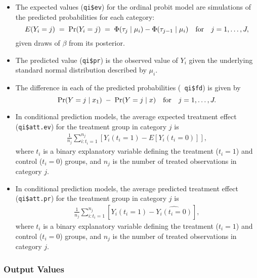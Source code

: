 \documentclass{article}
\begin{document}
\begin{itemize}
\item The expected values ({\tt qi\$ev}) for the ordinal probit model
  are simulations of the predicted probabilities for each category:
\begin{equation*}
    E(Y_i = j) \; = \; \Pr(Y_i = j) \; = \; \Phi(\tau_{j} \mid \mu_i)
    - \Phi(\tau_{j-1} \mid  \mu_i) \quad {\rm for} \quad j=1,\dots,J, 
\end{equation*}
given draws of $\beta$ from its posterior.
  
\item The predicted value ({\tt qi\$pr}) is the observed value of
  $Y_i$ given the underlying standard normal distribution described by
  $\mu_i$.

\item The difference in each of the predicted probabilities ({\tt
    qi\$fd}) is given by
  \begin{equation*}
    \Pr(Y=j \mid x_1) \;-\; \Pr(Y=j \mid x) \quad {\rm for} \quad
    j=1,\dots,J.
  \end{equation*}

\item In conditional prediction models, the average expected treatment effect
(\texttt{qi\$att.ev}) for the treatment group in category $j$ is
\begin{eqnarray*}
\frac{1}{n_j}\sum_{i:t_{i}=1}^{n_j}[Y_{i}(t_{i}=1)-E[Y_{i}(t_{i}=0)]],
\end{eqnarray*}
where $t_{i}$ is a binary explanatory variable defining the treatment
($t_{i}=1$) and control ($t_{i}=0$) groups, and $n_j$ is the 
number of treated observations in category $j$.

\item In conditional prediction models, the average predicted treatment effect
(\texttt{qi\$att.pr}) for the treatment group in category $j$ is
\begin{eqnarray*}
\frac{1}{n_j}\sum_{i:t_{i}=1}^{n_j}[Y_{i}(t_{i}=1)-\widehat{Y_{i}(t_{i}=0)}],
\end{eqnarray*}
where $t_{i}$ is a binary explanatory variable defining the treatment
($t_{i}=1$) and control ($t_{i}=0$) groups, and $n_j$ is the 
number of treated observations in category $j$.

\end{itemize}

\subsubsection{Output Values}
\end{document}

